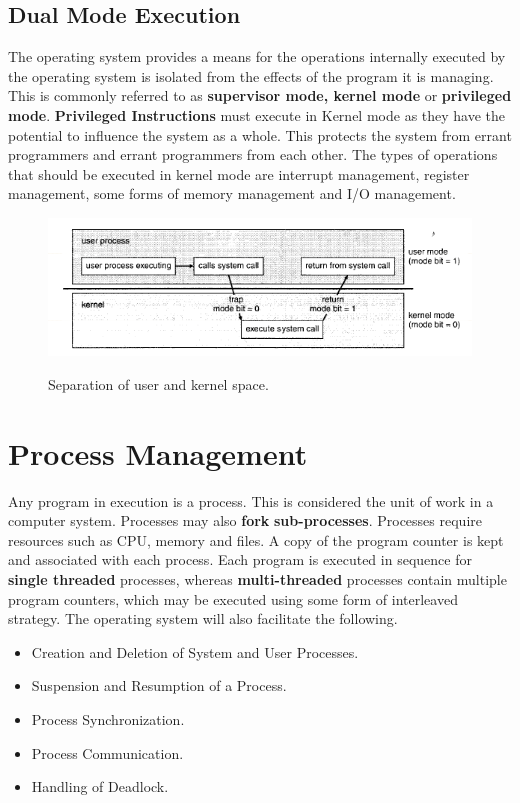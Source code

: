 \documentclass[10pt,a4paper]{article}
\begin{document}
\subsection{Dual Mode Execution}
The operating system provides a means for the operations internally executed by the operating system is isolated from the effects of the program it is managing. This is commonly referred to as {\bf supervisor mode, kernel mode} or {\bf privileged mode}. {\bf Privileged Instructions} must execute in Kernel mode as they have the potential to influence the system as a whole. This protects the system from errant programmers and errant programmers from each other. The types of operations that should be executed in kernel mode are interrupt management, register management, some forms of memory management and I/O management. 
\begin{figure}
\caption{Separation of user and kernel space. \cite{OSCONCEPTS}}
\begin{center}
\includegraphics[scale=0.45]{../images/kernel-mode.png}
\label{kernelmode}
\end{center}
\end{figure}
\section{Process Management}
Any program in execution is a process. This is considered the unit of work in a computer system. Processes may also {\bf fork} {\bf sub-processes}. Processes require resources such as CPU, memory and files. A copy of the program counter is kept and associated with each process. Each program is executed in sequence for {\bf single threaded} processes, whereas {\bf multi-threaded} processes contain multiple program counters, which may be executed using some form of interleaved strategy. The operating system will also facilitate the following.
\begin{itemize}
\item Creation and Deletion of System and User Processes. 
\item Suspension and Resumption of a Process.
\item Process Synchronization.
\item Process Communication.
\item Handling of Deadlock.
\end{itemize}
\end{document}
